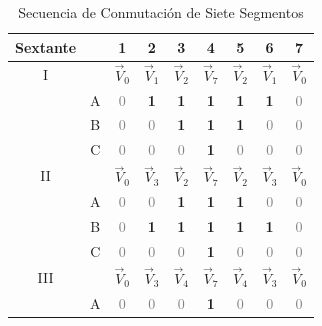 \documentclass[11pt]{report}
\begin{document}
\begin{table}[htbp]
    \centering
    \caption{Secuencia de Conmutación de Siete Segmentos}
    \begin{tabular}{c c c c c c c c c }
        \hline
        \textbf{Sextante} &   & \textbf{1}  & \textbf{2}  & \textbf{3}  & \textbf{4}  & \textbf{5}  & \textbf{6}  & \textbf{7}  \\
        \hline
        I                 &   & $\vec{V}_0$ & $\vec{V}_1$ & $\vec{V}_2$ & $\vec{V}_7$ & $\vec{V}_2$ & $\vec{V}_1$ & $\vec{V}_0$ \\
                          & A & \textcolor{gray}{0}         & \textbf{1}         & \textbf{1}         & \textbf{1}         & \textbf{1}         & \textbf{1}         & \textcolor{gray}{0}         \\
                          & B & \textcolor{gray}{0}         & \textcolor{gray}{0}         & \textbf{1}         & \textbf{1}         & \textbf{1}         & \textcolor{gray}{0}         & \textcolor{gray}{0}         \\
                          & C & \textcolor{gray}{0}         & \textcolor{gray}{0}         & \textcolor{gray}{0}         & \textbf{1}         & \textcolor{gray}{0}         & \textcolor{gray}{0}         & \textcolor{gray}{0}         \\
        \hline
        II                &   & $\vec{V}_0$ & $\vec{V}_3$ & $\vec{V}_2$ & $\vec{V}_7$ & $\vec{V}_2$ & $\vec{V}_3$ & $\vec{V}_0$ \\
                          & A & \textcolor{gray}{0}         & \textcolor{gray}{0}         & \textbf{1}         & \textbf{1}         & \textbf{1}         & \textcolor{gray}{0}         & \textcolor{gray}{0}         \\
                          & B & \textcolor{gray}{0}         & \textbf{1}         & \textbf{1}         & \textbf{1}         & \textbf{1}         & \textbf{1}         & \textcolor{gray}{0}         \\
                          & C & \textcolor{gray}{0}         & \textcolor{gray}{0}         & \textcolor{gray}{0}         & \textbf{1}         & \textcolor{gray}{0}         & \textcolor{gray}{0}         & \textcolor{gray}{0}         \\
        \hline
        III               &   & $\vec{V}_0$ & $\vec{V}_3$ & $\vec{V}_4$ & $\vec{V}_7$ & $\vec{V}_4$ & $\vec{V}_3$ & $\vec{V}_0$ \\
                          & A & \textcolor{gray}{0}         & \textcolor{gray}{0}         & \textcolor{gray}{0}         & \textbf{1}         & \textcolor{gray}{0}         & \textcolor{gray}{0}         & \textcolor{gray}{0}         \\

\end{tabular}
\end{table}
\end{document}
